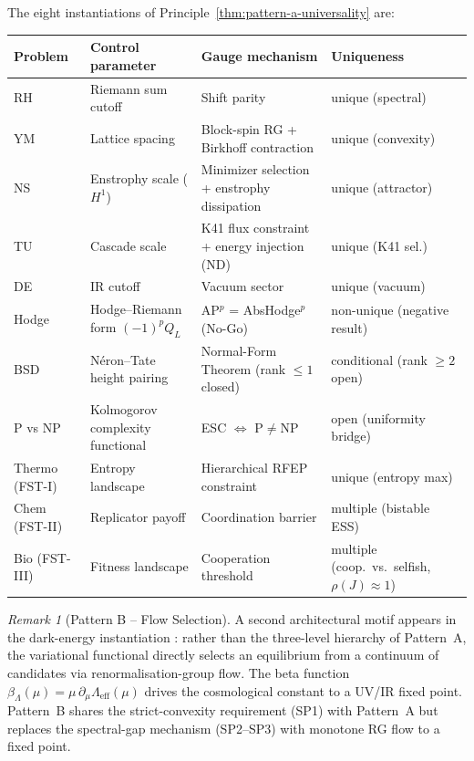 \documentclass[12pt,a4paper]{article}
\theoremstyle{definition}
\theoremstyle{remark}
\newtheorem{remark}[theorem]{Remark}
\begin{document}
The eight instantiations of Principle~\ref{thm:pattern-a-universality} are:

\medskip
\begin{center}
\small
\begin{tabular}{p{2.2cm}p{3.0cm}p{5.0cm}p{4.0cm}}
\hline
\textbf{Problem} & \textbf{Control parameter} & \textbf{Gauge mechanism} & \textbf{Uniqueness} \\
\hline
RH    & Riemann sum cutoff          & Shift parity                                    & unique (spectral) \\
YM    & Lattice spacing             & Block-spin RG + Birkhoff contraction            & unique (convexity) \\
NS    & Enstrophy scale ($H^1$)     & Minimizer selection + enstrophy dissipation      & unique (attractor) \\
TU    & Cascade scale               & K41 flux constraint + energy injection (ND)      & unique (K41 sel.) \\
DE    & IR cutoff                   & Vacuum sector                                   & unique (vacuum) \\
Hodge & Hodge--Riemann form $(-1)^p Q_L$ & AP$^p$ = AbsHodge$^p$ (No-Go)             & non-unique (negative result) \cite{Geiger2026-Hodge} \\
BSD   & N\'eron--Tate height pairing & Normal-Form Theorem (rank $\leq 1$ closed)     & conditional (rank $\geq 2$ open) \cite{Geiger2026-BSD} \\
P vs NP & Kolmogorov complexity functional & ESC $\Leftrightarrow$ P$\neq$NP          & open (uniformity bridge) \cite{Geiger2026-PvsNP} \\
Thermo (FST-I)  & Entropy landscape   & Hierarchical RFEP constraint                    & unique (entropy max) \\
Chem (FST-II)   & Replicator payoff   & Coordination barrier                            & multiple (bistable ESS) \\
Bio (FST-III)   & Fitness landscape   & Cooperation threshold                           & multiple (coop.\ vs.\ selfish, $\rho(J)\!\approx\!1$) \\
\hline
\end{tabular}
\normalsize
\end{center}

\begin{remark}[Pattern B -- Flow Selection]\label{rem:pattern-b}
A second architectural motif appears in the dark-energy instantiation \cite{Geiger2026-DE}: rather than the three-level hierarchy of Pattern~A, the variational functional directly selects an equilibrium from a continuum of candidates via renormalisation-group flow. The beta function $\beta_\Lambda(\mu) = \mu\,\partial_\mu \Lambda_{\mathrm{eff}}(\mu)$ drives the cosmological constant to a UV/IR fixed point. Pattern~B shares the strict-convexity requirement (SP1) with Pattern~A but replaces the spectral-gap mechanism (SP2--SP3) with monotone RG flow to a fixed point.
\end{remark}
\end{document}
